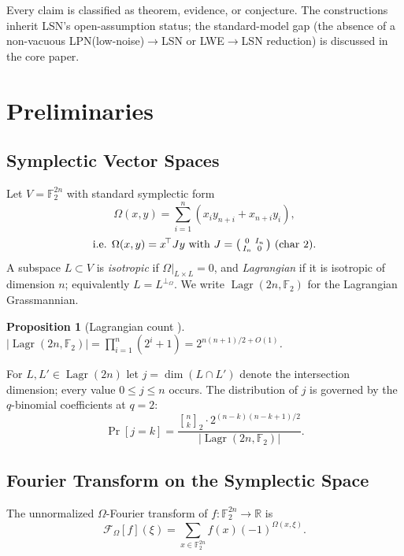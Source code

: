\documentclass[11pt,a4paper]{article}
\theoremstyle{plain}
\newtheorem{proposition}[theorem]{Proposition}
\theoremstyle{definition}
\newcommand{\F}{\mathbb{F}}
\DeclareMathOperator{\Lagr}{Lagr}
\newcommand{\R}{\mathbb{R}}
\begin{document}
Every claim is classified as theorem, evidence, or conjecture. The constructions inherit LSN's open-assumption status; the standard-model gap (the absence of a non-vacuous LPN(low-noise)$\to$LSN or LWE$\to$LSN reduction) is discussed in the core paper.

\section{Preliminaries}
\label{sec:prelim}

\subsection{Symplectic Vector Spaces}
\label{subsec:symplectic}

Let $V = \F_2^{2n}$ with standard symplectic form
\[
\Omega(x,y) = \sum_{i=1}^n (x_i y_{n+i} + x_{n+i} y_i),
\]
\[
\text{i.e. } \Omega(x,y) = x^{\!\top} J y \text{ with } J = \begin{psmallmatrix} 0 & I_n \\ I_n & 0 \end{psmallmatrix} \text{ (char 2)}.
\]
A subspace $L \subset V$ is \emph{isotropic} if $\Omega|_{L \times L} = 0$, and \emph{Lagrangian} if it is isotropic of dimension $n$; equivalently $L = L^{\perp_\Omega}$. We write $\Lagr(2n, \F_2)$ for the Lagrangian Grassmannian.

\begin{proposition}[Lagrangian count \cite{AG04}]
$|\Lagr(2n, \F_2)| = \prod_{i=1}^n (2^i + 1) = 2^{n(n+1)/2 + O(1)}$.
\end{proposition}

For $L, L' \in \Lagr(2n)$ let $j = \dim(L \cap L')$ denote the intersection dimension; every value $0 \le j \le n$ occurs. The distribution of $j$ is governed by the $q$-binomial coefficients at $q=2$:
\begin{equation}
\label{eq:j-distribution}
\Pr[j=k] = \frac{{n \brack k}_2 \cdot 2^{(n-k)(n-k+1)/2}}{|\Lagr(2n,\F_2)|}.
\end{equation}

\subsection{Fourier Transform on the Symplectic Space}
\label{subsec:fourier}

The unnormalized $\Omega$-Fourier transform of $f \colon \F_2^{2n} \to \R$ is
\[
\mathcal{F}_\Omega[f](\xi) = \sum_{x \in \F_2^{2n}} f(x) (-1)^{\Omega(x, \xi)}.
\]
\end{document}
